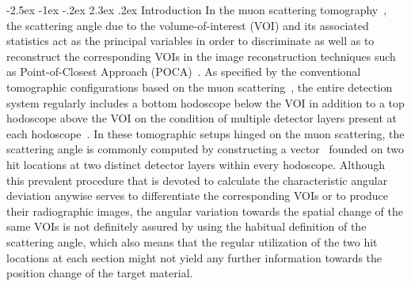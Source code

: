 \documentclass[10.75pt]{article}
\makeatletter
\renewcommand\section{\@startsection{section}{1}{\z@}%
   {-2.5ex \@plus -1ex \@minus -.2ex}%
   {2.3ex \@plus.2ex}%
   {\normalfont\large\bfseries}}
\makeatother
\begin{document}
\section{Introduction}
In the muon scattering tomography~\cite{pesente2009first, Checchia_2016, procureur2018muon, bonechi2020atmospheric}, the scattering angle due to the volume-of-interest (VOI) and its associated statistics act as the principal variables in order to discriminate as well as to reconstruct the corresponding VOIs in the image reconstruction techniques such as Point-of-Closest Approach (POCA)~\cite{schultz2003cosmic, bandieramonte2013automated, yu2013preliminary, liu2018muon, yang2019novel,zeng2020principle, liu2021muon}.  As specified by the conventional tomographic configurations based on the muon scattering~\cite{borozdin2003radiographic}, the entire detection system regularly includes a bottom hodoscope below the VOI in addition to a top hodoscope above the VOI on the condition of multiple detector layers present at each hodoscope~\cite{bandieramonte2013automated, yu2013preliminary, zeng2020principle}. In these tomographic setups hinged on the muon scattering, the scattering angle is commonly computed by constructing a vector~\cite{carlisle2012multiple, nugent2017multiple, poulson2019application} founded on two hit locations at two distinct detector layers within every hodoscope. Although this prevalent procedure that is devoted to calculate the characteristic angular deviation anywise serves to differentiate the corresponding VOIs or to produce their radiographic images, the angular variation towards the spatial change of the same VOIs is not definitely assured by using the habitual definition of the scattering angle, which also means that the regular utilization of the two hit locations at each section might not yield any further information towards the position change of the target material.
\end{document}
